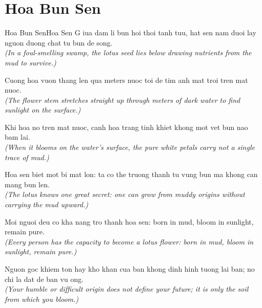 \section{Hoa Bun Sen}
\begin{truyen}{Hoa Bun Sen}{Hoa Sen}
G iua dam li bun hoi thoi tanh tuu, hat sen nam duoi lay nguon duong chat tu bun de song.\\
\textit{(In a foul-smelling swamp, the lotus seed lies below drawing nutrients from the mud to survive.)}

Cuong hoa vuon thang len qua meters nuoc toi de tim anh mat troi tren mat nuoc.\\
\textit{(The flower stem stretches straight up through meters of dark water to find sunlight on the surface.)}

Khi hoa no tren mat nuoc, canh hoa trang tinh khiet khong mot vet bun nao bam lai.\\
\textit{(When it blooms on the water's surface, the pure white petals carry not a single trace of mud.)}

Hoa sen biet mot bi mat lon: ta co the truong thanh tu vung bun ma khong can mang bun len.\\
\textit{(The lotus knows one great secret: one can grow from muddy origins without carrying the mud upward.)}

Moi nguoi deu co kha nang tro thanh hoa sen: born in mud, bloom in sunlight, remain pure.\\
\textit{(Every person has the capacity to become a lotus flower: born in mud, bloom in sunlight, remain pure.)}

\end{truyen}
\begin{baihoc}
  Nguon goc khiem ton hay kho khan cua ban khong dinh hinh tuong lai ban; no chi la dat de ban vu ong.\\
  \textit{(Your humble or difficult origin does not define your future; it is only the soil from which you bloom.)}
\end{baihoc}
